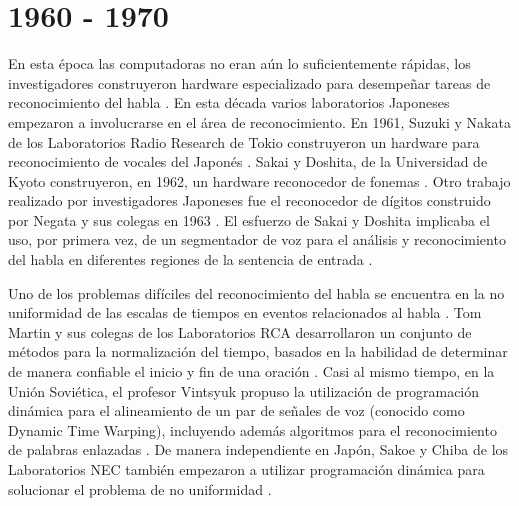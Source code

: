 \section{1960 - 1970}
\label{sec:60s}

En esta \'{e}poca las computadoras no eran a\'un lo suficientemente r\'{a}pidas, los investigadores
construyeron hardware especializado para desempe\~{n}ar tareas de reconocimiento del habla \cite{Furui50Years2004}.
En esta d\'{e}cada varios laboratorios Japoneses empezaron a involucrarse en el \'{a}rea de reconocimiento. En 1961,
Suzuki y Nakata de los Laboratorios Radio Research de Tokio construyeron un hardware para reconocimiento de vocales
del Japon\'{e}s \cite{SuzukiRecognition1961}. Sakai y Doshita, de la Universidad de Kyoto construyeron, en 1962, un
hardware reconocedor de fonemas \cite{SakaiThePhonetic1962}. Otro trabajo realizado por investigadores Japoneses fue
el reconocedor de d\'{i}gitos construido por Negata y sus colegas en 1963 \cite{NagataSpoken1963}. El esfuerzo de
Sakai y Doshita implicaba el uso, por primera vez, de un segmentador de voz para el an\'{a}lisis y reconocimiento
del habla en diferentes regiones de la sentencia de entrada \cite{JaisalAReview2012}.

Uno de los problemas dif\'{i}ciles del reconocimiento del habla se encuentra en la no uniformidad de las escalas de
tiempos en eventos relacionados al habla \cite{Furui50Years2004}. Tom Martin y sus colegas de los Laboratorios RCA
desarrollaron un conjunto de m\'{e}todos para la normalizaci\'{o}n del tiempo, basados en la habilidad de determinar
de manera confiable el inicio y fin de una oraci\'{o}n \cite{MartinSpeech1964}. Casi al mismo tiempo, en la Uni\'{o}n
Sovi\'{e}tica, el profesor Vintsyuk propuso la utilizaci\'{o}n de programaci\'{o}n din\'{a}mica para el alineamiento de un par
de se\~{n}ales de voz (conocido como Dynamic Time Warping), incluyendo adem\'{a}s algoritmos para el 
reconocimiento de palabras enlazadas \cite{VintsyukSpeech1968}. De manera independiente en Jap\'{o}n, Sakoe y Chiba de los
Laboratorios NEC tambi\'{e}n empezaron a utilizar programaci\'{o}n din\'{a}mica para solucionar el problema de no uniformidad
\cite{SakoeDynamic1978}.
